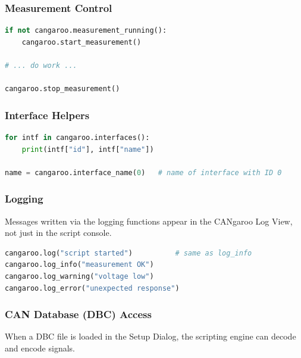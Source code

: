 \documentclass[a4paper,11pt]{article}
\begin{document}
\subsubsection{Measurement Control}

\begin{lstlisting}[language=Python]
if not cangaroo.measurement_running():
    cangaroo.start_measurement()

# ... do work ...

cangaroo.stop_measurement()
\end{lstlisting}

\subsubsection{Interface Helpers}

\begin{lstlisting}[language=Python, caption={List all active interfaces}]
for intf in cangaroo.interfaces():
    print(intf["id"], intf["name"])

name = cangaroo.interface_name(0)   # name of interface with ID 0
\end{lstlisting}

\subsubsection{Logging}

Messages written via the logging functions appear in the CANgaroo Log View, not
just in the script console.

\begin{lstlisting}[language=Python]
cangaroo.log("script started")          # same as log_info
cangaroo.log_info("measurement OK")
cangaroo.log_warning("voltage low")
cangaroo.log_error("unexpected response")
\end{lstlisting}

\subsubsection{CAN Database (DBC) Access}

When a DBC file is loaded in the Setup Dialog, the scripting engine can decode and
encode signals.
\end{document}
